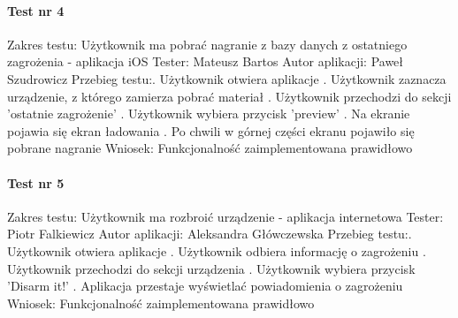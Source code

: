 \documentclass[polish,bachelor,a4paper,oneside]{ppfcmthesis}
\begin{document}
    \paragraph{Test nr 4}
    Zakres testu:\newline
    Użytkownik ma pobrać nagranie z bazy danych z ostatniego zagrożenia - aplikacja iOS\newline
    Tester: Mateusz Bartos \newline
    Autor aplikacji: Paweł Szudrowicz \newline
    Przebieg testu:. Użytkownik otwiera aplikacje . Użytkownik zaznacza urządzenie, z którego zamierza pobrać materiał . Użytkownik przechodzi do sekcji 'ostatnie zagrożenie' . Użytkownik wybiera przycisk 'preview' . Na ekranie pojawia się ekran ładowania . Po chwili w górnej części ekranu pojawiło się pobrane nagranie \newline
    Wniosek:\newline
    Funkcjonalność zaimplementowana prawidłowo\newline

    \paragraph{Test nr 5}
    Zakres testu:\newline
    Użytkownik ma rozbroić urządzenie - aplikacja internetowa\newline
    Tester: Piotr Falkiewicz \newline
    Autor aplikacji: Aleksandra Główczewska \newline
    Przebieg testu:. Użytkownik otwiera aplikacje . Użytkownik odbiera informację o zagrożeniu . Użytkownik przechodzi do sekcji urządzenia . Użytkownik wybiera przycisk 'Disarm it!' . Aplikacja przestaje wyświetlać powiadomienia o zagrożeniu \newline
    Wniosek:\newline
    Funkcjonalność zaimplementowana prawidłowo\newline
    \newline
\end{document}
